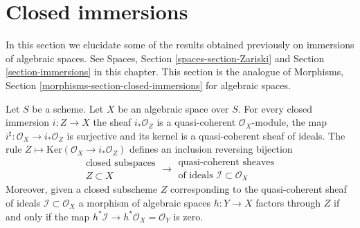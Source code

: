 \section{Closed immersions}
\label{section-closed-immersions}

\noindent
In this section we elucidate some of the results obtained previously on
immersions of algebraic spaces. See
Spaces, Section \ref{spaces-section-Zariski}
and
Section \ref{section-immersions} in this chapter.
This section is the analogue of
Morphisms, Section \ref{morphisms-section-closed-immersions}
for algebraic spaces.

\begin{lemma}
\label{lemma-closed-immersion-ideals}
Let $S$ be a scheme.
Let $X$ be an algebraic space over $S$.
For every closed immersion $i : Z \to X$ the sheaf
$i_*\mathcal{O}_Z$ is a quasi-coherent $\mathcal{O}_X$-module, the map
$i^\sharp : \mathcal{O}_X \to i_*\mathcal{O}_Z$ is surjective and its
kernel is a quasi-coherent sheaf of ideals. The rule
$Z \mapsto \text{Ker}(\mathcal{O}_X \to i_*\mathcal{O}_Z)$
defines an inclusion reversing bijection
$$
\begin{matrix}
\text{closed subspaces}\\
Z \subset X
\end{matrix}
\longrightarrow
\begin{matrix}
\text{quasi-coherent sheaves}\\
\text{of ideals }\mathcal{I} \subset \mathcal{O}_X
\end{matrix}
$$
Moreover, given a closed subscheme $Z$ corresponding to the quasi-coherent
sheaf of ideals $\mathcal{I} \subset \mathcal{O}_X$ a morphism of algebraic
spaces $h : Y \to X$ factors through $Z$ if and only if the map
$h^*\mathcal{I} \to h^*\mathcal{O}_X = \mathcal{O}_Y$ is zero.
\end{lemma}

